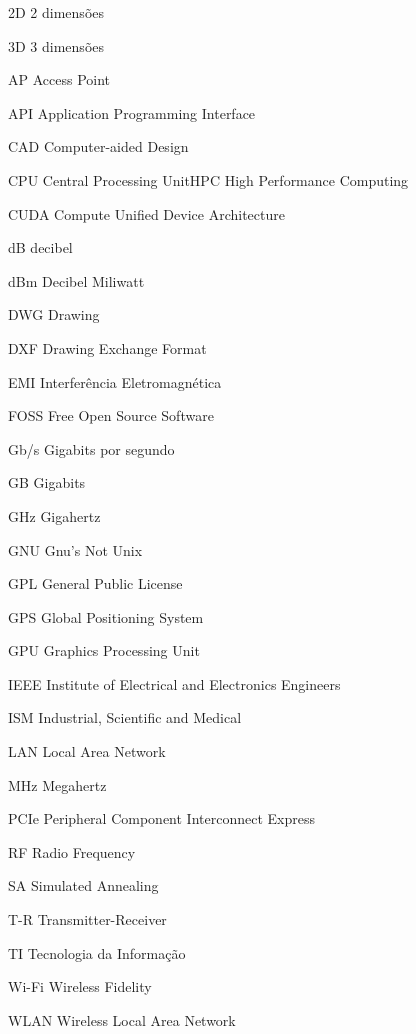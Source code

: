 \documentclass[
	12pt,				%
	twoside,			%
	a4paper,			%
	english,			%
	french,				%
	spanish,			%
	brazil				%
	]{abntex2}
\newcommand{\listofquadrosname}{Lista de quadros}
\begin{document}

\listoffigures*
\cleardoublepage


\pdfbookmark[0]{\listofquadrosname}{loq}
\listofquadros*
\cleardoublepage

\listoftables*
\cleardoublepage

\begin{siglas}
  \item[2D] 2 dimensões
  \item[3D] 3 dimensões
  \item[AP] Access Point
  \item[API] Application Programming Interface
  \item[CAD] Computer-aided Design
  \item[CPU] Central Processing UnitHPC High Performance Computing
  \item[CUDA] Compute Unified Device Architecture
  \item[dB] decibel
  \item[dBm] Decibel Miliwatt
  \item[DWG] Drawing
  \item[DXF] Drawing Exchange Format
  \item[EMI] Interferência Eletromagnética
  \item[FOSS] Free Open Source Software
  \item[Gb/s] Gigabits por segundo
  \item[GB] Gigabits
  \item[GHz] Gigahertz
  \item[GNU] Gnu's Not Unix
  \item[GPL] General Public License
  \item[GPS] Global Positioning System
  \item[GPU] Graphics Processing Unit
  \item[IEEE] Institute of Electrical and Electronics Engineers
  \item[ISM] Industrial, Scientific and Medical
  \item[LAN] Local Area Network
  \item[MHz] Megahertz
  \item[PCIe] Peripheral Component Interconnect Express
  \item[RF] Radio Frequency
  \item[SA] Simulated Annealing
  \item[T-R] Transmitter-Receiver
  \item[TI] Tecnologia da Informação
  \item[Wi-Fi] Wireless Fidelity
  \item[WLAN] Wireless Local Area Network
\end{siglas}
\end{document}
